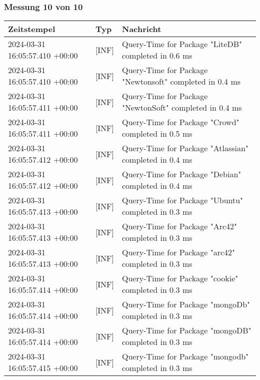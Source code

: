     \subsubsection*{Messung 10 von 10} \label{subsubsec:MySQLMitIndex10von10}
        {
            {\small
                \begin{tabularx}{\textwidth}{|l|l|X|}
                    \hline
                    \textbf{Zeitstempel} & \textbf{Typ} & \textbf{Nachricht} \\
                    \hline
                    \endhead
                    2024-03-31 16:05:57.410 +00:00 & [INF] & Query-Time for Package "LiteDB" completed in 0.6 ms \\
                    2024-03-31 16:05:57.410 +00:00 & [INF] & Query-Time for Package "Newtonsoft" completed in 0.4 ms \\
                    2024-03-31 16:05:57.411 +00:00 & [INF] & Query-Time for Package "NewtonSoft" completed in 0.4 ms \\
                    2024-03-31 16:05:57.411 +00:00 & [INF] & Query-Time for Package "Crowd" completed in 0.5 ms \\
                    2024-03-31 16:05:57.412 +00:00 & [INF] & Query-Time for Package "Atlassian" completed in 0.4 ms \\
                    2024-03-31 16:05:57.412 +00:00 & [INF] & Query-Time for Package "Debian" completed in 0.4 ms \\
                    2024-03-31 16:05:57.413 +00:00 & [INF] & Query-Time for Package "Ubuntu" completed in 0.3 ms \\
                    2024-03-31 16:05:57.413 +00:00 & [INF] & Query-Time for Package "Arc42" completed in 0.3 ms \\
                    2024-03-31 16:05:57.413 +00:00 & [INF] & Query-Time for Package "arc42" completed in 0.3 ms \\
                    2024-03-31 16:05:57.414 +00:00 & [INF] & Query-Time for Package "cookie" completed in 0.3 ms \\
                    2024-03-31 16:05:57.414 +00:00 & [INF] & Query-Time for Package "mongoDb" completed in 0.3 ms \\
                    2024-03-31 16:05:57.414 +00:00 & [INF] & Query-Time for Package "mongoDB" completed in 0.3 ms \\
                    2024-03-31 16:05:57.415 +00:00 & [INF] & Query-Time for Package "mongodb" completed in 0.3 ms \\

\end{tabularx}}}
